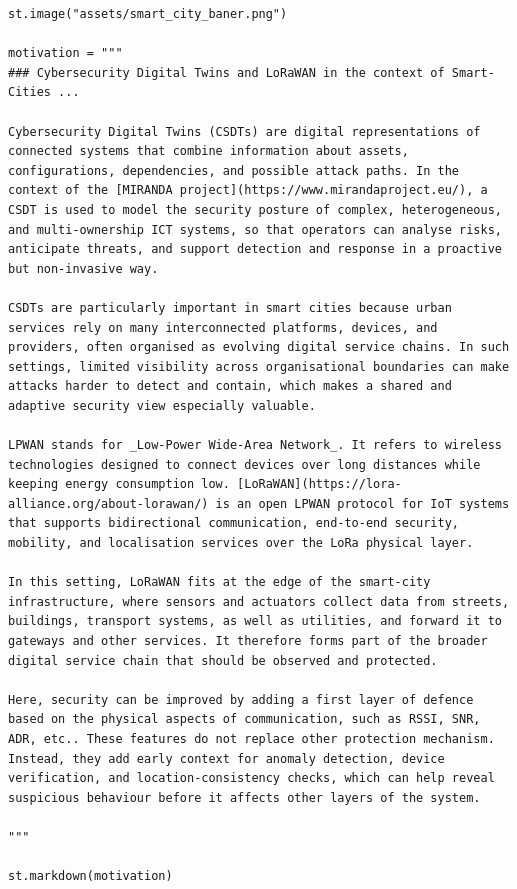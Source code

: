 \documentclass[11pt]{article}
\begin{document}
\begin{verbatim}
st.image("assets/smart_city_baner.png")

motivation = """
### Cybersecurity Digital Twins and LoRaWAN in the context of Smart-Cities ... 

Cybersecurity Digital Twins (CSDTs) are digital representations of connected systems that combine information about assets, configurations, dependencies, and possible attack paths. In the context of the [MIRANDA project](https://www.mirandaproject.eu/), a CSDT is used to model the security posture of complex, heterogeneous, and multi-ownership ICT systems, so that operators can analyse risks, anticipate threats, and support detection and response in a proactive but non-invasive way.

CSDTs are particularly important in smart cities because urban services rely on many interconnected platforms, devices, and providers, often organised as evolving digital service chains. In such settings, limited visibility across organisational boundaries can make attacks harder to detect and contain, which makes a shared and adaptive security view especially valuable.

LPWAN stands for _Low-Power Wide-Area Network_. It refers to wireless technologies designed to connect devices over long distances while keeping energy consumption low. [LoRaWAN](https://lora-alliance.org/about-lorawan/) is an open LPWAN protocol for IoT systems that supports bidirectional communication, end-to-end security, mobility, and localisation services over the LoRa physical layer.

In this setting, LoRaWAN fits at the edge of the smart-city infrastructure, where sensors and actuators collect data from streets, buildings, transport systems, as well as utilities, and forward it to gateways and other services. It therefore forms part of the broader digital service chain that should be observed and protected.

Here, security can be improved by adding a first layer of defence based on the physical aspects of communication, such as RSSI, SNR, ADR, etc.. These features do not replace other protection mechanism. Instead, they add early context for anomaly detection, device verification, and location-consistency checks, which can help reveal suspicious behaviour before it affects other layers of the system.

"""

st.markdown(motivation)
\end{verbatim}
\end{document}
